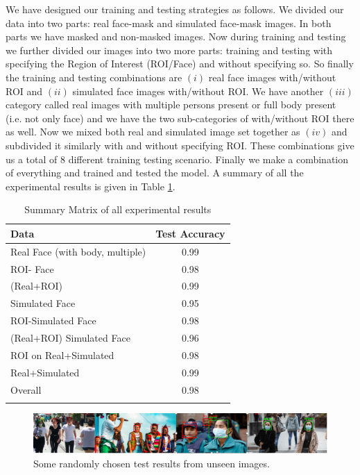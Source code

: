 \documentclass{svproc}
\begin{document}
We have designed our training and testing strategies as follows. We divided our data into two parts: real face-mask and simulated face-mask images. In both parts we have masked and non-masked images. Now during training and testing we further divided our images into two more parts: training and testing with specifying the Region of Interest (ROI/Face) and without specifying so. So finally the training and testing combinations are $(i)$ real face images with/without ROI and $(ii)$ simulated face images with/without ROI. We have another $(iii)$ category called real images with multiple persons present or full body present (i.e. not only face) and we have the two sub-categories of with/without ROI there as well. Now we mixed both real and simulated image set together as $(iv)$ and subdivided it similarly with and without specifying ROI. These combinations give us a total of 8 different training testing scenario. Finally we make a combination of everything and trained and tested the model. A summary of all the experimental results is given in Table \ref{expResult}.

\begin{table}[]
\centering
\begin{tabular}{lc}
\hline
Data & Test Accuracy \\
\hline
Real Face (with body, multiple) & 0.99 \\
ROI- Face                       & 0.98 \\
(Real+ROI)                      & 0.99 \\
Simulated Face                  & 0.95 \\
ROI-Simulated Face              & 0.98 \\
(Real+ROI) Simulated Face       & 0.96 \\
ROI on Real+Simulated           & 0.98 \\
Real+Simulated                  & 0.99 \\
Overall                         & 0.98 \\
\hline \\
\end{tabular}
\caption{Summary Matrix of all experimental results}
\label{expResult}
\end{table}

\begin{figure}[!ht]
\includegraphics[width=1\textwidth]{test_image.PNG}
\centering
\caption{Some randomly chosen test results from unseen images.}
\label{testresult}
\end{figure}
\end{document}
